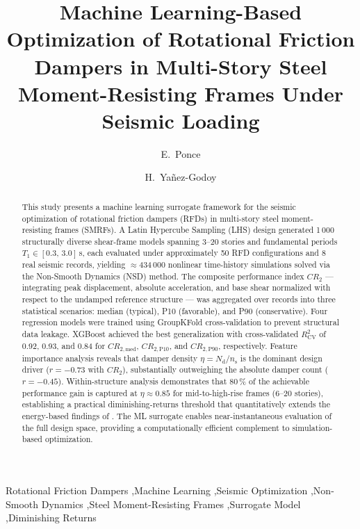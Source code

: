 \documentclass[preprint,12pt,authoryear]{elsarticle}
\newcommand{\CR}[1]{CR_{2,\text{#1}}}          %
\newcommand{\Rsq}{R^{2}_{\mathrm{CV}}}
\newcommand{\nd}{N_{\mathrm{d}}}               %
\newcommand{\np}{n_{\mathrm{s}}}               %
\newcommand{\etad}{\eta}                        %
\begin{document}
\begin{frontmatter}

\title{Machine Learning-Based Optimization of Rotational Friction Dampers
       in Multi-Story Steel Moment-Resisting Frames Under Seismic Loading}

\author[uaq]{E.~Ponce}
\author[i2m]{H.~Yañez-Godoy}

\address[uaq]{Universidad Autónoma de Querétaro, Facultad de Ingeniería,
              Cerro de las Campanas s/n, Querétaro, México}
\address[i2m]{Arts et Metiers Institute of Technology, University of Bordeaux,
              Centre National de la Recherche Scientifique (CNRS),
              Bordeaux INP, I2M, UMR 5295, 33400 Talence, France}

\begin{abstract}
This study presents a machine learning surrogate framework for the seismic
optimization of rotational friction dampers (RFDs) in multi-story steel
moment-resisting frames (SMRFs). A Latin Hypercube Sampling (LHS) design
generated 1\,000 structurally diverse shear-frame models spanning 3--20 stories
and fundamental periods $T_1 \in [0.3,\,3.0]$\,s, each evaluated under
approximately 50 RFD configurations and 8 real seismic records, yielding
$\approx$434\,000 nonlinear time-history simulations solved via the
Non-Smooth Dynamics (NSD) method. The composite performance index $CR_2$
--- integrating peak displacement, absolute acceleration, and base shear
normalized with respect to the undamped reference structure --- was
aggregated over records into three statistical scenarios: median (typical),
P10 (favorable), and P90 (conservative). Four regression models were
trained using GroupKFold cross-validation to prevent structural data
leakage. XGBoost achieved the best generalization with cross-validated
$\Rsq$ of 0.92, 0.93, and 0.84 for $\CR{med}$, $\CR{P10}$, and
$\CR{P90}$, respectively. Feature importance analysis reveals that damper
density $\etad = \nd/\np$ is the dominant design driver
($r=-0.73$ with $CR_2$), substantially outweighing the absolute damper
count ($r=-0.45$). Within-structure analysis demonstrates that 80\,\% of
the achievable performance gain is captured at $\etad \approx 0.85$ for
mid-to-high-rise frames (6--20 stories), establishing a
practical diminishing-returns threshold that quantitatively extends the
energy-based findings of \citet{Jarrahi2020sdee}. The ML surrogate enables
near-instantaneous evaluation of the full design space, providing a
computationally efficient complement to simulation-based optimization.
\end{abstract}

\begin{keyword}
Rotational Friction Dampers \sep Machine Learning \sep Seismic Optimization
\sep Non-Smooth Dynamics \sep Steel Moment-Resisting Frames \sep Surrogate Model
\sep Diminishing Returns
\end{keyword}

\end{frontmatter}
\end{document}
